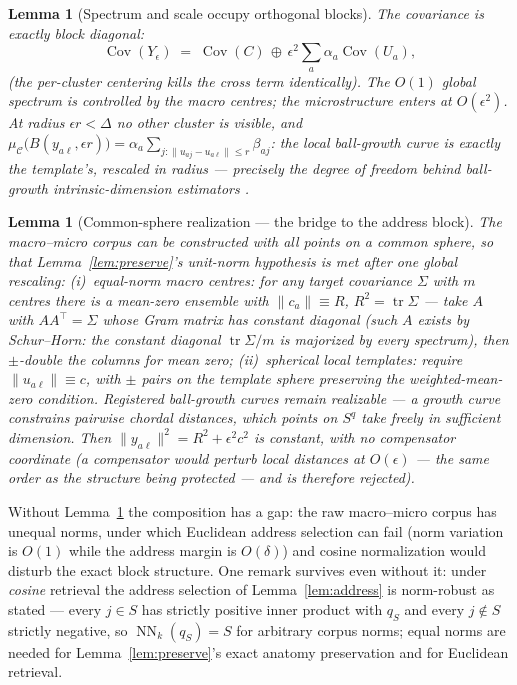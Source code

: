 \documentclass[11pt]{article}
\newcommand{\muC}{\mu_{\mathcal{C}}}
\newcommand{\NN}{\operatorname{NN}}
\newcommand{\Cov}{\operatorname{Cov}}
\newtheorem{lemma}[theorem]{Lemma}
\begin{document}
\begin{lemma}[Spectrum and scale occupy orthogonal blocks]\label{lem:macromicro}
The covariance is exactly block diagonal:
\[
\Cov(Y_\epsilon) \;=\; \Cov(C) \,\oplus\, \epsilon^2 \sum_a \alpha_a \Cov(U_a),
\]
(the per-cluster centering kills the cross term identically). The $O(1)$
global spectrum is controlled by the macro centres; the microstructure enters
at $O(\epsilon^2)$. At radius $\epsilon r < \Delta$ no other cluster is
visible, and
$\muC\bigl(B(y_{a\ell}, \epsilon r)\bigr)
= \alpha_a \sum_{j:\|u_{aj}-u_{a\ell}\| \le r} \beta_{aj}$:
the local ball-growth curve is exactly the template's, rescaled in radius ---
precisely the degree of freedom behind ball-growth intrinsic-dimension
estimators \cite{levina04,facco17}.
\end{lemma}

\begin{lemma}[Common-sphere realization --- the bridge to the address block]
\label{lem:bridge}
The macro--micro corpus can be constructed with \emph{all points on a common
sphere}, so that Lemma~\ref{lem:preserve}'s unit-norm hypothesis is met after
one global rescaling:
(i)~\emph{equal-norm macro centres}: for any target covariance $\Sigma$ with
$m$ centres there is a mean-zero ensemble with $\|c_a\| \equiv R$,
$R^2 = \operatorname{tr}\Sigma$ --- take $A$ with $AA^\top = \Sigma$ whose
Gram matrix has constant diagonal (such $A$ exists by Schur--Horn: the
constant diagonal $\operatorname{tr}\Sigma/m$ is majorized by every spectrum),
then $\pm$-double the columns for mean zero;
(ii)~\emph{spherical local templates}: require $\|u_{a\ell}\| \equiv c$, with
$\pm$ pairs on the template sphere preserving the weighted-mean-zero
condition. Registered ball-growth curves remain realizable --- a growth curve
constrains pairwise chordal distances, which points on $S^{q}$ take freely in
sufficient dimension. Then $\|y_{a\ell}\|^2 = R^2 + \epsilon^2 c^2$ is
constant, with \emph{no} compensator coordinate (a compensator would perturb
local distances at $O(\epsilon)$ --- the same order as the structure being
protected --- and is therefore rejected).
\end{lemma}

Without Lemma~\ref{lem:bridge} the composition has a gap: the raw macro--micro
corpus has unequal norms, under which Euclidean address selection can fail
(norm variation is $O(1)$ while the address margin is $O(\delta)$) and
cosine normalization would disturb the exact block structure. One remark
survives even without it: under \emph{cosine} retrieval the address selection
of Lemma~\ref{lem:address} is norm-robust as stated --- every $j \in S$ has
strictly positive inner product with $q_S$ and every $j \notin S$ strictly
negative, so $\NN_k(q_S) = S$ for arbitrary corpus norms; equal norms are
needed for Lemma~\ref{lem:preserve}'s exact anatomy preservation and for
Euclidean retrieval.
\end{document}
